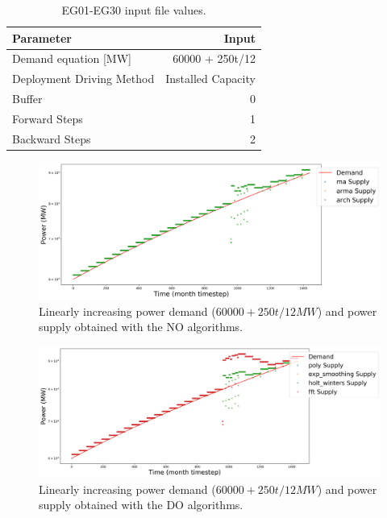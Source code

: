 \documentclass[11pt]{article}
\begin{document}
\begin{table}[H]
	\centering
	\caption{EG01-EG30 input file values.}
	\label{tab:30-inputs}
	\begin{tabularx}{\textwidth}{lR}
		\hline
		Parameter			& Input \\ 	\hline
		Demand equation	[MW]	& 60000 + 250t/12  \\
		Deployment Driving Method 	& Installed Capacity \\
		Buffer    			& 0 \\
		Forward Steps		& 1 \\
		Backward Steps		& 2 \\		\hline
	\end{tabularx}
\end{table}

\begin{figure}[H]
	\centering
	\includegraphics[width=\textwidth]{30-figures/lin-30-power-buffer01.png} 
	\hfill
	\caption{Linearly increasing power demand ($60000 + 250t/12 MW$) and power supply obtained with the NO algorithms.}
	\label{fig:30-lin-NO}
\end{figure}

\begin{figure}[H]
	\centering
	\includegraphics[width=\textwidth]{30-figures/lin-30-power-buffer02.png} 
	\hfill
	\caption{Linearly increasing power demand ($60000 + 250t/12 MW$) and power supply obtained with the DO algorithms.}
	\label{fig:30-lin-DO}
\end{figure}
\end{document}
